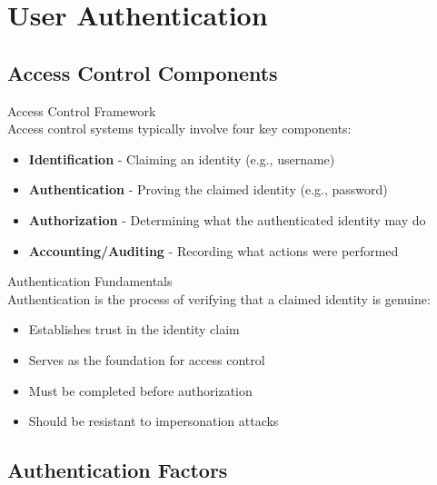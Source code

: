 \section{User Authentication}

\subsection{Access Control Components}

\begin{definition}{Access Control Framework}\\
Access control systems typically involve four key components:
\begin{itemize}
    \item \textbf{Identification} - Claiming an identity (e.g., username)
    \item \textbf{Authentication} - Proving the claimed identity (e.g., password)
    \item \textbf{Authorization} - Determining what the authenticated identity may do
    \item \textbf{Accounting/Auditing} - Recording what actions were performed
\end{itemize}
\end{definition}

\begin{concept}{Authentication Fundamentals}\\
Authentication is the process of verifying that a claimed identity is genuine:
\begin{itemize}
    \item Establishes trust in the identity claim
    \item Serves as the foundation for access control
    \item Must be completed before authorization
    \item Should be resistant to impersonation attacks
\end{itemize}
\end{concept}

\subsection{Authentication Factors}

